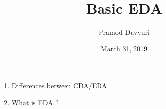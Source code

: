 \documentclass[11pt]{article}
\title{Basic EDA}
\author{Pramod Duvvuri}
\date{March 31, 2019}
\begin{document}
	\maketitle
	\begin{enumerate}
		\item Differences between CDA/EDA
		\item What is EDA ?
	\end{enumerate}
	
\end{document}
